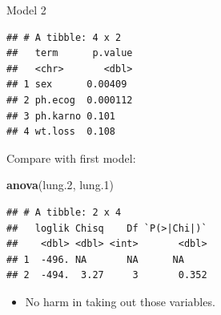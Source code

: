 \documentclass[
  ignorenonframetext,
]{beamer}
\newenvironment{Shaded}{\begin{snugshade}}{\end{snugshade}}
\newcommand{\FloatTok}[1]{\textcolor[rgb]{0.00,0.00,0.81}{#1}}
\newcommand{\KeywordTok}[1]{\textcolor[rgb]{0.13,0.29,0.53}{\textbf{#1}}}
\newcommand{\NormalTok}[1]{#1}
\newcommand{\OperatorTok}[1]{\textcolor[rgb]{0.81,0.36,0.00}{\textbf{#1}}}
\newcommand{\StringTok}[1]{\textcolor[rgb]{0.31,0.60,0.02}{#1}}
\providecommand{\tightlist}{%
  \setlength{\itemsep}{0pt}\setlength{\parskip}{0pt}}
\begin{document}
\begin{frame}[fragile]{Model 2}
\protect\hypertarget{model-2}{}

\normalsize

\begin{Shaded}
\end{Shaded}

\begin{verbatim}
## # A tibble: 4 x 2
##   term      p.value
##   <chr>       <dbl>
## 1 sex      0.00409 
## 2 ph.ecog  0.000112
## 3 ph.karno 0.101   
## 4 wt.loss  0.108
\end{verbatim}

\normalsize

\end{frame}

\begin{frame}[fragile]{Compare with first model:}
\protect\hypertarget{compare-with-first-model}{}

\normalsize

\begin{Shaded}
\begin{Highlighting}[]
\KeywordTok{anova}\NormalTok{(lung}\FloatTok{.2}\NormalTok{, lung}\FloatTok{.1}\NormalTok{)}
\end{Highlighting}
\end{Shaded}

\begin{verbatim}
## # A tibble: 2 x 4
##   loglik Chisq    Df `P(>|Chi|)`
##    <dbl> <dbl> <int>       <dbl>
## 1  -496. NA       NA      NA    
## 2  -494.  3.27     3       0.352
\end{verbatim}

\normalsize

\begin{itemize}
\tightlist
\item
  No harm in taking out those variables.
\end{itemize}

\end{frame}
\end{document}
